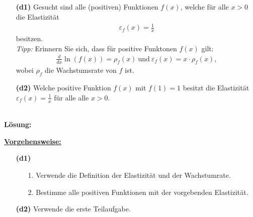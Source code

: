 \subsection*{}
\begin{enumerate}
	\item[\textbf{(d1)}]
	Gesucht sind alle (positiven) Funktionen $ f(x) $, welche für alle $ x > 0 $ die Elastizität
	\begin{align*}
		\varepsilon_f(x) = \frac{1}{x}
	\end{align*}
	besitzen.\\
	\textit{Tipp:} Erinnern Sie sich, dass für positive Funktonen $ f(x) $ gilt:
	\begin{align*}
		\frac{d}{dx} \ln(f(x)) = \rho_f(x) 
		\ \textrm{und} \
		\varepsilon_f(x) = x \cdot \rho_f(x),
	\end{align*}
	wobei $ \rho_f $ die Wachstumsrate von $ f $ ist.
	\item[\textbf{(d2)}]
	Welche positive Funktion $ f(x) $ mit $ f(1) = 1 $ besitzt die Elastizität $ \varepsilon_f(x) = \frac{1}{x} $ für alle alle $ x >0 $.
\end{enumerate}
\ \\
\textbf{Lösung:}
\begin{mdframed}
\underline{\textbf{Vorgehensweise:}}
\begin{enumerate}
\item[\textbf{(d1)}]
\begin{enumerate}
	\item[1.] Verwende die Definition der Elastizität und der Wachstumrate.
	\item[2.] 
	Bestimme alle positiven Funktionen mit der vorgebenden Elastizität.
\end{enumerate}
\item[\textbf{(d2)}] 
Verwende die erste Teilaufgabe.
\end{enumerate}
\end{mdframed}

